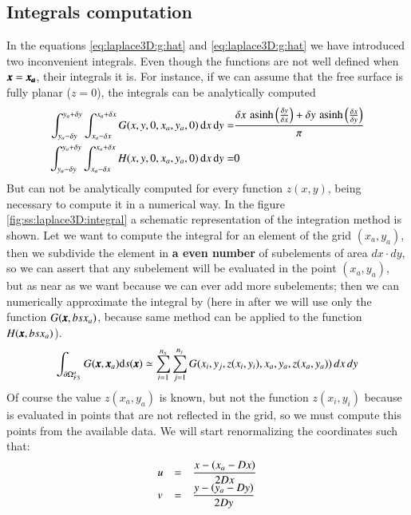 \subsection{Integrals computation}
\label{sss:laplace3D:integrals}
%
In the equations \ref{eq:laplace3D:g:hat} and \ref{eq:laplace3D:g:hat}
we have introduced two inconvenient integrals. Even though the functions
are not well defined when $\bs{x} = \bs{x_a}$, their integrals it is.
For instance, if we can assume that the free surface is fully planar
($z = 0$), the integrals can be analytically computed
%
\begin{eqnarray*}
	\dsty \int_{y_a - \delta y}^{y_a + \delta y} \int_{x_a - \delta x}^{x_a + \delta x}
		G(x,y,0,x_a,y_a,0)
	\, \mbox{d}x \, \mbox{d}y
	= &
	\dsty \frac{
		\delta x \, \, \mbox{asinh}\left(\frac{\delta y}{\delta x}\right)
		+
		\delta y \, \, \mbox{asinh}\left(\frac{\delta x}{\delta y}\right)
	}{\pi}
	\\
	\dsty \int_{y_a - \delta y}^{y_a + \delta y} \int_{x_a - \delta x}^{x_a + \delta x}
		H(x,y,0,x_a,y_a,0)
	\, \mbox{d}x \, \mbox{d}y
	= &
	0
\end{eqnarray*}
%
But can not be analytically computed for every function $z(x,y)$, being
necessary to compute it in a numerical way.\rc
%
In the figure \ref{fig:ss:laplace3D:integral} a schematic representation
of the integration method is shown. Let we want to compute the integral
for an element of the grid $(x_a,y_a)$, then we subdivide the element in
\textbf{a even number} of subelements of area $dx \cdot dy$, so we can
assert that any subelement will be evaluated in the point $(x_a,y_a)$,
but as near as we want because we can ever add more subelements; then we
can numerically approximate the integral by (here in after we will use
only the function $G(\bs{x}, bs{x_a})$, because same method can be applied
to the function $H(\bs{x}, bs{x_a})$).
%
\begin{eqnarray}
	\label{eq:laplace3D:integral:g}
	\dsty \int_{\partial \Omega_{FS}^a} G(\bs{x}, \bs{x}_a) \mbox{d} s(\bs{x})
	\simeq
	\sum_{i=1}^{n_x} \sum_{j=1}^{n_y} G(x_i,y_j,z(x_i,y_i), x_a, y_a, z(x_a, y_a)) \, dx \, dy
\end{eqnarray}
%
Of course the value $z(x_a, y_a)$ is known, but not the function $z(x_i,y_i)$
because is evaluated in points that are not reflected in the grid, so we must
compute this points from the available data. We will start renormalizing the
coordinates such that:
%
\begin{eqnarray}
	\label{eq:laplace3D:integral:uv}
	\begin{array}{lcl}
	u & = & \dsty \frac{x - \left(x_a - Dx\right)}{2 Dx}
	\\
	v & = & \dsty \frac{y - \left(y_a - Dy\right)}{2 Dy} 
	\end{array}
\end{eqnarray}
